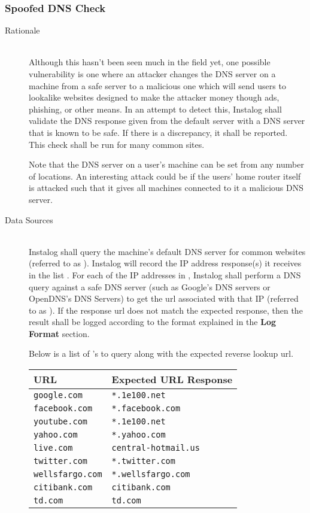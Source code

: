 \subsubsection{Spoofed DNS Check}
\begin{description}
\item[Rationale] \hfill \\
Although this hasn't been seen much in the field yet, one possible vulnerability
is one where an attacker changes the DNS server on a machine from a safe server
to a malicious one which will send users to lookalike websites designed to make
the attacker money though ads, phishing, or other means.  In an attempt to
detect this, Instalog shall validate the DNS response given from the default
server with a DNS server that is known to be safe.  If there is a discrepancy,
it shall be reported.  This check shall be run for many common sites.

Note that the DNS server on a user's machine can be set from any number of
locations.  An interesting attack could be if the users' home router itself is
attacked such that it gives all machines connected to it a malicious DNS server.
\item[Data Sources] \hfill \\
Instalog shall query the machine's default DNS server for common websites
(referred to as ).  Instalog will record the IP address response(s) it
receives in the list .  For each of the
 IP addresses in , Instalog shall perform a DNS
query against a safe DNS server (such as Google's DNS servers or OpenDNS's DNS
Servers) to get the url associated with that IP (referred to as ).
If the response url does not match the expected response, then the result shall be
logged according to the format explained in the \textbf{Log Format} section.

Below is a list of 's to query along with the expected reverse lookup
url.

\begin{tabular}{l | l}
\textbf{URL} & \textbf{Expected URL Response} \\ \hline 
\verb|google.com| & \verb|*.1e100.net| \\ \hline
\verb|facebook.com| & \verb|*.facebook.com| \\ \hline
\verb|youtube.com| & \verb|*.1e100.net| \\ \hline
\verb|yahoo.com| & \verb|*.yahoo.com| \\ \hline
\verb|live.com| & \verb|central-hotmail.us| \\ \hline
\verb|twitter.com| & \verb|*.twitter.com| \\ \hline
\verb|wellsfargo.com| & \verb|*.wellsfargo.com| \\ \hline
\verb|citibank.com| & \verb|citibank.com| \\ \hline
\verb|td.com| & \verb|td.com|
\end{tabular}


\end{description}
